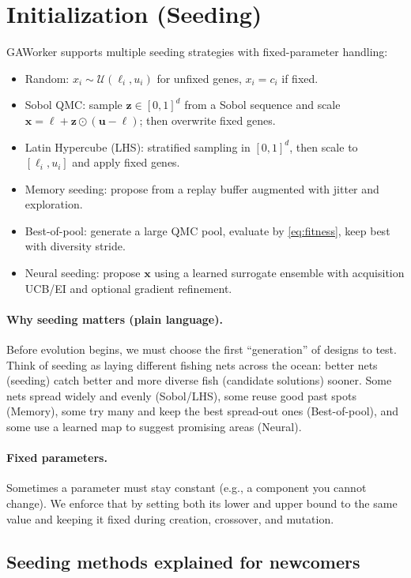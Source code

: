 \documentclass[12pt,a4paper]{article}
\begin{document}
\section{Initialization (Seeding)}
GAWorker supports multiple seeding strategies with fixed-parameter handling:
\begin{itemize}
\item Random: $x_i \sim \mathcal{U}(\ell_i,u_i)$ for unfixed genes, $x_i=c_i$ if fixed.
\item Sobol QMC: sample $\bm{z} \in [0,1]^d$ from a Sobol sequence and scale $\bm{x}=\bm{\ell}+\bm{z}\odot(\bm{u}-\bm{\ell})$; then overwrite fixed genes.
\item Latin Hypercube (LHS): stratified sampling in $[0,1]^d$, then scale to $[\ell_i,u_i]$ and apply fixed genes.
\item Memory seeding: propose from a replay buffer augmented with jitter and exploration.
\item Best-of-pool: generate a large QMC pool, evaluate by \eqref{eq:fitness}, keep best with diversity stride.
\item Neural seeding: propose $\bm{x}$ using a learned surrogate ensemble with acquisition UCB/EI and optional gradient refinement.
\end{itemize}

\paragraph{Why seeding matters (plain language).}
Before evolution begins, we must choose the first ``generation'' of designs to test. Think of seeding as laying different fishing nets across the ocean: better nets (seeding) catch better and more diverse fish (candidate solutions) sooner. Some nets spread widely and evenly (Sobol/LHS), some reuse good past spots (Memory), some try many and keep the best spread-out ones (Best-of-pool), and some use a learned map to suggest promising areas (Neural).

\paragraph{Fixed parameters.}
Sometimes a parameter must stay constant (e.g., a component you cannot change). We enforce that by setting both its lower and upper bound to the same value and keeping it fixed during creation, crossover, and mutation.

\subsection*{Seeding methods explained for newcomers}
\end{document}
